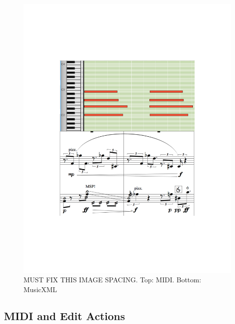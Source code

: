 \documentclass[final,authoryear,5p,times,twocolumn]{elsarticle}
\begin{document}
\begin{figure}
\vspace*{-3cm}
	\includegraphics[scale=0.4]{midi.pdf}
	\caption{MUST FIX THIS IMAGE SPACING. Top: MIDI. Bottom: MusicXML}
	\label{fig:midi}
\end{figure}

\subsection{MIDI and Edit Actions}
\end{document}

